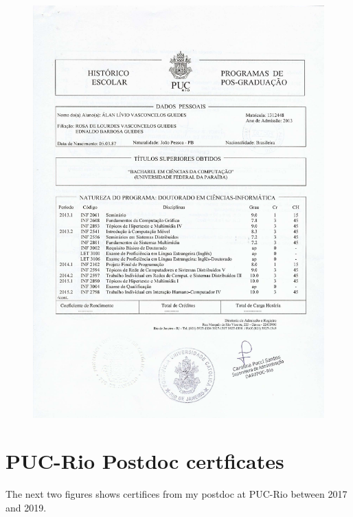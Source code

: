\documentclass[10pt,a4paper,sans,colorlinks]{moderncv}
\begin{document}
\begin{figure}
    \centering
    \includegraphics[align=t,page=2,width=\textwidth,height=0.6\paperheight, keepaspectratio=true]{certificates/phd-grades.pdf}
\end{figure}

\newpage
\section{PUC-Rio Postdoc certficates}
The next two figures shows certifices from my postdoc at PUC-Rio between 2017 and 2019.
\end{document}
